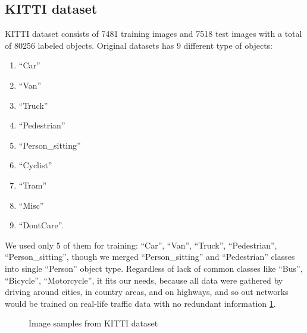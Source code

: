 \documentclass[twoside]{ctuthesis}
\theoremstyle{plain}
\theoremstyle{definition}
\theoremstyle{note}
\begin{document}
\subsection{KITTI dataset}
KITTI dataset consists of 7481 training images and 7518 test images with a total of 80256 labeled objects. Original datasets has 9 different type of objects:
\begin{enumerate}
\item ``Car''
\item ``Van''
\item ``Truck''
\item ``Pedestrian'' 
\item ``Person\_sitting''
\item ``Cyclist''
\item ``Tram''
\item ``Misc''
\item ``DontCare''.
\end{enumerate}
We used only 5 of them for training: ``Car'', ``Van'', ``Truck'', ``Pedestrian'', ``Person\_sitting'', though we merged ``Person\_sitting'' and ``Pedestrian'' classes into single ``Person'' object type. Regardless   of lack of common classes like ``Bus'', ``Bicycle'', ``Motorcycle'', it fits our needs, because all data were gathered by driving around cities, in country areas, and on highways, and so out networks would be trained on real-life traffic data with no redundant information \ref{fig:kitti-examples}.       
\begin{figure}[hbt]
        \centering
        
        \hfill
                \caption{Image samples from KITTI dataset}
                \label{fig:kitti-examples}
\end{figure}
\end{document}
